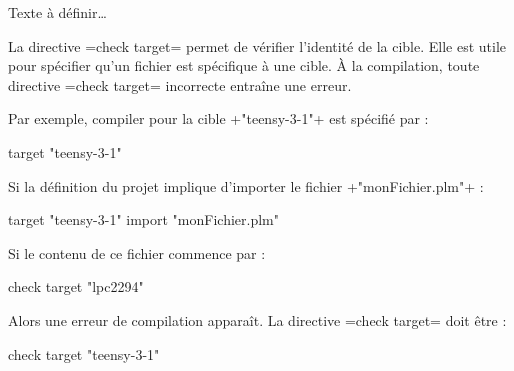 Texte à définir…





La directive \plm=check target= permet de vérifier l'identité de la cible. Elle est utile pour spécifier qu'un fichier est spécifique à une cible. À la compilation, toute directive \plm=check target= incorrecte entraîne une erreur.

Par exemple, compiler pour la cible \plm+"teensy-3-1"+ est spécifié par :

\begin{PLM}
target "teensy-3-1"
\end{PLM}

Si la définition du projet implique d'importer le fichier \plm+"monFichier.plm"+ :

\begin{PLM}
target "teensy-3-1"
import "monFichier.plm"
\end{PLM}

Si le contenu de ce fichier commence par :
\begin{PLM}
check target "lpc2294"
\end{PLM}

Alors une erreur de compilation apparaît. La directive \plm=check target= doit être :
\begin{PLM}
check target "teensy-3-1"
\end{PLM}

